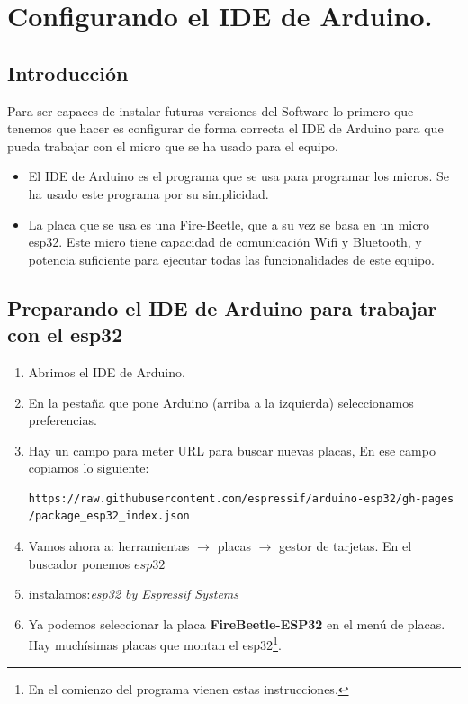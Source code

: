 \chapter{Configurando el IDE de Arduino.}




\section{Introducción}

Para ser capaces de instalar futuras versiones del Software lo primero que tenemos que hacer es configurar de forma correcta el IDE de Arduino para que pueda trabajar con el micro que se ha usado para el equipo. 
\begin{itemize}
\item El IDE de Arduino es el programa que se usa para programar los micros. Se ha usado este programa por su simplicidad.
\item La placa que se usa es una Fire-Beetle, que a su vez se basa en un micro esp32. Este micro tiene capacidad de comunicación Wifi y Bluetooth, y potencia suficiente para ejecutar todas las funcionalidades de este equipo.
\end{itemize}

\section{Preparando el IDE de Arduino para trabajar con el esp32}

\begin{enumerate}
\item Abrimos el IDE de Arduino.
\item En la pestaña que pone Arduino (arriba a la izquierda) seleccionamos preferencias.
\item Hay un campo para meter URL para buscar nuevas placas, En ese campo copiamos lo siguiente:
\begin{verbatim}
https://raw.githubusercontent.com/espressif/arduino-esp32/gh-pages
/package_esp32_index.json
\end{verbatim}
\item Vamos ahora a: herramientas $\rightarrow$ placas $\rightarrow$ gestor de tarjetas. En el buscador ponemos $esp32$
\item instalamos:\emph{esp32 by Espressif Systems}
\item Ya podemos seleccionar la placa \textbf{FireBeetle-ESP32} en el menú de placas. Hay muchísimas placas que montan el esp32\footnote{En el comienzo del programa vienen estas instrucciones.}.
\end{enumerate}

